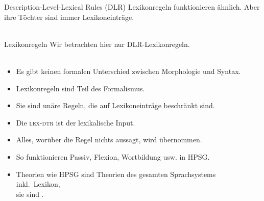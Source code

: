 \begin{frame}
  {Description-Level-Lexical Rules (DLR)}
  \onslide<+->
  \onslide<+->
  \alert{Lexikonregeln} funktionieren ähnlich. Aber \alert{ihre Töchter sind immer Lexikoneinträge}.\\
  \onslide<+->
  \Zeile
  \centering 
  \\
  \Halbzeile
  \onslide<+->
\end{frame}

\begin{frame}
  {Lexikonregeln}
  \onslide<+->
  \onslide<+->
  Wir betrachten hier nur DLR-Lexikonregeln.\\
  \\
  \Halbzeile
  \begin{itemize}[<+->]
    \item Es gibt keinen formalen Unterschied zwischen Morphologie und Syntax.
    \item Lexikonregeln sind Teil des Formalismus.
    \item Sie sind unäre Regeln, die auf Lexikoneinträge beschränkt sind.
    \item Die \textsc{lex-dtr} ist der lexikalische Input.
    \item Alles, worüber die Regel nichts aussagt, wird übernommen.
      \Halbzeile
    \item So funktionieren Passiv, Flexion, Wortbildung usw. in HPSG.
    \item Theorien wie HPSG sind \alert{Theorien des gesamten Sprachsystems} inkl.\ Lexikon,\\
      sie sind .
  \end{itemize}
\end{frame}

